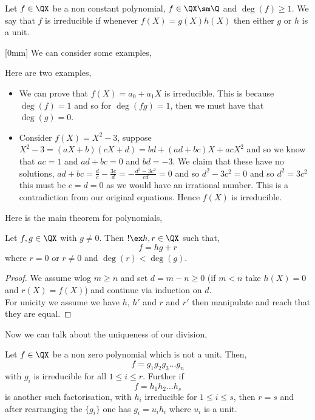 \begin{ndefi}[Irriducible]
  Let $f \in\QX$ be a non constant polynomial, $f \in \QX\sm\Q$ and $\deg(f) \ge 1$. We say that $f$ is irreducible if whenever $f(X) = g(X)h(X)$ then either $g$ or $h$ is a unit.
\end{ndefi}
[0mm]
\noindent
We can consider some examples,
\begin{eg} Here are two examples,
  \begin{itemize}
    \item We can prove that $f(X) = a_0 + a_1X$ is irreducible. This is because $\deg(f) = 1$ and so for $\deg(fg) = 1$, then we must have that $\deg(g) = 0$.
    \item Consider $f(X) = X^2- 3$, suppose $X^2 - 3 = (aX + b)(cX + d) = bd + (ad + bc)X + acX^2$ and so we know that $ac = 1$ and $ad + bc = 0$ and $bd = -3$. We claim that these have no solutions, $ad + bc = \frac{d}{c} - \frac{3c}{d} = - \frac{d^2 - 3c^2}{cd} = 0$ and so $d^2 - 3c^2 = 0$ and so $d^2 = 3c^2$ this must be $c = d = 0$ as we would have an irrational number. This is a contradiction from our original equations. Hence $f(X)$ is irreducible.
  \end{itemize}
\end{eg}

Here is the main theorem for polynomials,
\begin{nthm}
  Let $f, g \in \QX$ with $g \ne 0$. Then $!\ex h, r \in \QX$ such that,
  $$ f = hg + r $$
  where $r = 0$ or $r \ne 0$ and $\deg(r) < \deg(g)$.
\end{nthm}
\begin{proof}
  We assume wlog $m \ge n$ and set $d = m - n \ge 0$ (if $m < n$ take $h(X) = 0$ and $r(X) = f(X)$) and continue via induction on $d$.\\

  For unicity we assume we have $h$, $h'$ and $r$ and $r'$ then manipulate and reach that they are equal.
\end{proof}

Now we can talk about the uniqueness of our division,

\begin{nthm}
  Let $f \in \QX$ be a non zero polynomial which is not a unit. Then,
  $$ f = g_1g_2g_3\dots g_n $$
  with $g_i$ is irreducible for all $1 \le i \le r$. Further if
  $$ f = h_1h_2\dots h_s $$
  is another such factorisation, with $h_i$ irreducible for $1 \le i \le s$, then $r = s$ and after rearranging the $\{g_i\}$ one has $g_i = u_ih_i$ where $u_i$ is a unit.
\end{nthm}

